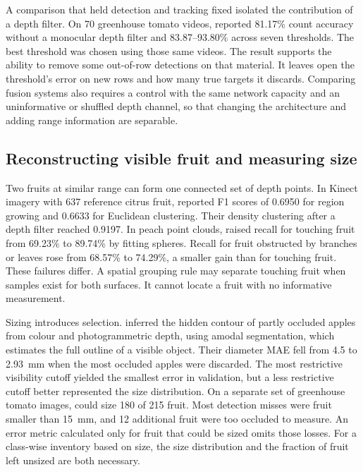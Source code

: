 A comparison that held detection and tracking fixed isolated the contribution of a depth filter. On 70 greenhouse tomato videos, \citet{zhang2024counting} reported 81.17\% count accuracy without a monocular depth filter and 83.87--93.80\% across seven thresholds. The best threshold was chosen using those same videos. The result supports the ability to remove some out-of-row detections on that material. It leaves open the threshold's error on new rows and how many true targets it discards. Comparing fusion systems also requires a control with the same network capacity and an uninformative or shuffled depth channel, so that changing the architecture and adding range information are separable.

\subsection{Reconstructing visible fruit and measuring size}

Two fruits at similar range can form one connected set of depth points. In Kinect imagery with 637 reference citrus fruit, \citet{lin2019field} reported F1 scores of 0.6950 for region growing and 0.6633 for Euclidean clustering. Their density clustering after a depth filter reached 0.9197. In peach point clouds, \citet{wu2019automatic} raised recall for touching fruit from 69.23\% to 89.74\% by fitting spheres. Recall for fruit obstructed by branches or leaves rose from 68.57\% to 74.29\%, a smaller gain than for touching fruit. These failures differ. A spatial grouping rule may separate touching fruit when samples exist for both surfaces. It cannot locate a fruit with no informative measurement.

Sizing introduces selection. \citet{genemola2023looking} inferred the hidden contour of partly occluded apples from colour and photogrammetric depth, using amodal segmentation, which estimates the full outline of a visible object. Their diameter MAE fell from 4.5 to 2.93~mm when the most occluded apples were discarded. The most restrictive visibility cutoff yielded the smallest error in validation, but a less restrictive cutoff better represented the size distribution. On a separate set of greenhouse tomato images, \citet{hao2024vision} could size 180 of 215 fruit. Most detection misses were fruit smaller than 15~mm, and 12 additional fruit were too occluded to measure. An error metric calculated only for fruit that could be sized omits those losses. For a class-wise inventory based on size, the size distribution and the fraction of fruit left unsized are both necessary.

